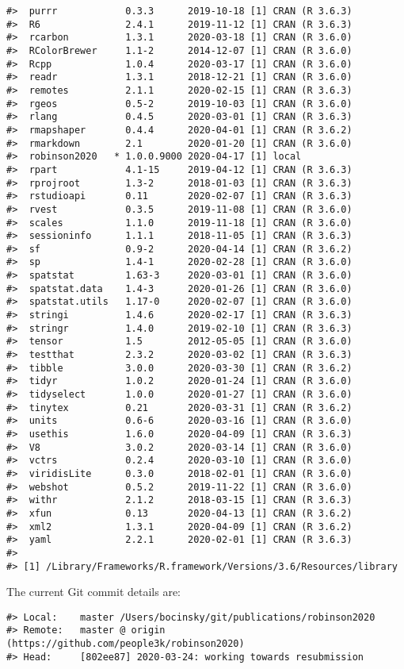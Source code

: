 \documentclass[
]{sa}
\begin{document}
\begin{verbatim}
#>  purrr            0.3.3      2019-10-18 [1] CRAN (R 3.6.3)
#>  R6               2.4.1      2019-11-12 [1] CRAN (R 3.6.3)
#>  rcarbon          1.3.1      2020-03-18 [1] CRAN (R 3.6.0)
#>  RColorBrewer     1.1-2      2014-12-07 [1] CRAN (R 3.6.0)
#>  Rcpp             1.0.4      2020-03-17 [1] CRAN (R 3.6.0)
#>  readr            1.3.1      2018-12-21 [1] CRAN (R 3.6.0)
#>  remotes          2.1.1      2020-02-15 [1] CRAN (R 3.6.3)
#>  rgeos            0.5-2      2019-10-03 [1] CRAN (R 3.6.0)
#>  rlang            0.4.5      2020-03-01 [1] CRAN (R 3.6.3)
#>  rmapshaper       0.4.4      2020-04-01 [1] CRAN (R 3.6.2)
#>  rmarkdown        2.1        2020-01-20 [1] CRAN (R 3.6.0)
#>  robinson2020   * 1.0.0.9000 2020-04-17 [1] local         
#>  rpart            4.1-15     2019-04-12 [1] CRAN (R 3.6.3)
#>  rprojroot        1.3-2      2018-01-03 [1] CRAN (R 3.6.3)
#>  rstudioapi       0.11       2020-02-07 [1] CRAN (R 3.6.3)
#>  rvest            0.3.5      2019-11-08 [1] CRAN (R 3.6.0)
#>  scales           1.1.0      2019-11-18 [1] CRAN (R 3.6.0)
#>  sessioninfo      1.1.1      2018-11-05 [1] CRAN (R 3.6.3)
#>  sf               0.9-2      2020-04-14 [1] CRAN (R 3.6.2)
#>  sp               1.4-1      2020-02-28 [1] CRAN (R 3.6.0)
#>  spatstat         1.63-3     2020-03-01 [1] CRAN (R 3.6.0)
#>  spatstat.data    1.4-3      2020-01-26 [1] CRAN (R 3.6.0)
#>  spatstat.utils   1.17-0     2020-02-07 [1] CRAN (R 3.6.0)
#>  stringi          1.4.6      2020-02-17 [1] CRAN (R 3.6.3)
#>  stringr          1.4.0      2019-02-10 [1] CRAN (R 3.6.3)
#>  tensor           1.5        2012-05-05 [1] CRAN (R 3.6.0)
#>  testthat         2.3.2      2020-03-02 [1] CRAN (R 3.6.3)
#>  tibble           3.0.0      2020-03-30 [1] CRAN (R 3.6.2)
#>  tidyr            1.0.2      2020-01-24 [1] CRAN (R 3.6.0)
#>  tidyselect       1.0.0      2020-01-27 [1] CRAN (R 3.6.0)
#>  tinytex          0.21       2020-03-31 [1] CRAN (R 3.6.2)
#>  units            0.6-6      2020-03-16 [1] CRAN (R 3.6.0)
#>  usethis          1.6.0      2020-04-09 [1] CRAN (R 3.6.3)
#>  V8               3.0.2      2020-03-14 [1] CRAN (R 3.6.0)
#>  vctrs            0.2.4      2020-03-10 [1] CRAN (R 3.6.0)
#>  viridisLite      0.3.0      2018-02-01 [1] CRAN (R 3.6.0)
#>  webshot          0.5.2      2019-11-22 [1] CRAN (R 3.6.0)
#>  withr            2.1.2      2018-03-15 [1] CRAN (R 3.6.3)
#>  xfun             0.13       2020-04-13 [1] CRAN (R 3.6.2)
#>  xml2             1.3.1      2020-04-09 [1] CRAN (R 3.6.2)
#>  yaml             2.2.1      2020-02-01 [1] CRAN (R 3.6.3)
#> 
#> [1] /Library/Frameworks/R.framework/Versions/3.6/Resources/library
\end{verbatim}

The current Git commit details are:

\begin{verbatim}
#> Local:    master /Users/bocinsky/git/publications/robinson2020
#> Remote:   master @ origin (https://github.com/people3k/robinson2020)
#> Head:     [802ee87] 2020-03-24: working towards resubmission
\end{verbatim}
\end{document}
